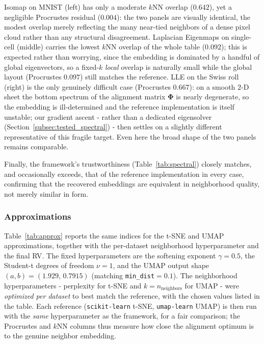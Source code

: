 \documentclass[11pt]{article}
\begin{document}
	Isomap on MNIST (left) has only a moderate $k$NN overlap ($0.642$), yet a
	negligible Procrustes residual ($0.004$): the two panels are visually identical,
	the modest overlap merely reflecting the many near-tied neighbors of a dense
	pixel cloud rather than any structural disagreement. Laplacian Eigenmaps on
	single-cell (middle) carries the lowest $k$NN overlap of the whole table
	($0.092$); this is expected rather than worrying, since the embedding is dominated
	by a handful of global eigenvectors, so a fixed-$k$ \emph{local} overlap is
	naturally small while the global layout (Procrustes $0.097$) still matches the
	reference. LLE on the Swiss roll (right) is the only genuinely difficult case
	(Procrustes $0.667$): on a smooth $2$-D sheet the bottom spectrum of the alignment
	matrix $\bm{\Phi}$ is nearly degenerate, so the embedding is ill-determined and
	the reference implementation is itself unstable; our gradient ascent - rather
	than a dedicated eigensolver (Section~\ref{subsec:tested_spectral}) - then
	settles on a slightly different representative of this fragile target. Even here
	the broad shape of the two panels remains comparable.
	
	Finally, the framework's trustworthiness (Table~\ref{tab:spectral}) closely
	matches, and occasionally exceeds, that of the reference implementation in
	every case, confirming that the recovered embeddings are equivalent in
	neighborhood quality, not merely similar in form.
	
	\subsubsection{Approximations}
	\label{subsec:results_approx}
	
	Table~\ref{tab:approx} reports the same indices for the t-SNE and UMAP
	approximations, together with the per-dataset neighborhood hyperparameter and
	the final RV. The fixed hyperparameters are the softening exponent $\gamma=0.5$,
	the Student-t degrees of freedom $\nu=1$, and the UMAP output shape
	$(a,b)=(1.929,\,0.7915)$ (matching \texttt{min\_dist}$=0.1$). The neighborhood
	hyperparameters - perplexity for t-SNE and $k=n_\text{neighbors}$ for UMAP -
	were \emph{optimized per dataset} to best match the reference, with the chosen
	values listed in the table. Each reference (\texttt{scikit-learn} t-SNE,
	\texttt{umap-learn} UMAP) is then run with the \emph{same} hyperparameter as the
	framework, for a fair comparison; the Procrustes and $k$NN columns thus measure
	how close the alignment optimum is to the genuine neighbor embedding.
	
\end{document}
